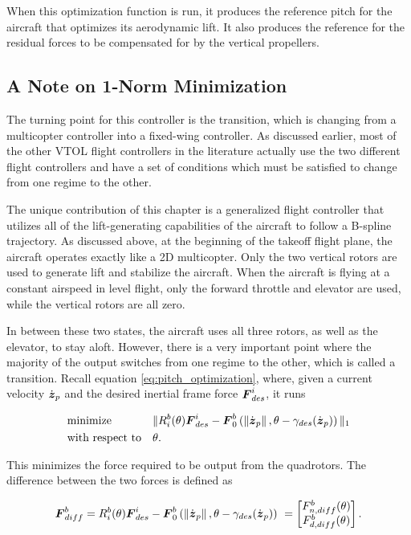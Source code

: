 When this optimization function is run, it produces the reference pitch for the aircraft that optimizes its aerodynamic lift.
It also produces the reference for the residual forces to be compensated for by the vertical propellers.

\subsection{A Note on 1-Norm Minimization}
\label{sec:one norm}

The turning point for this controller is the transition, which is changing from a multicopter controller into a fixed-wing controller. 
As discussed earlier, most of the other VTOL flight controllers in the literature actually use the two different flight controllers and have a set of conditions which must be satisfied to change from one regime to the other.

The unique contribution of this chapter is a generalized flight controller that utilizes all of the lift-generating capabilities of the aircraft to follow a B-spline trajectory. 
As discussed above, at the beginning of the takeoff flight plane, the aircraft operates exactly like a 2D multicopter. 
Only the two vertical rotors are used to generate lift and stabilize the aircraft. 
When the aircraft is flying at a constant airspeed in level flight, only the forward throttle and elevator are used, while the vertical rotors are all zero.

In between these two states, the aircraft uses all three rotors, as well as the elevator, to stay aloft. 
However, there is a very important point where the majority of the output switches from one regime to the other, which is called a transition. 
Recall equation \ref{eq:pitch_optimization}, where, given a current velocity $\dot{\boldsymbol{z}}_p$ and the desired inertial frame force $\boldsymbol{F}_{des}^i$, it runs

\begin{align}
    &\text{minimize} &&\|R_i^b(\theta)\boldsymbol{F}_{des}^i - \boldsymbol{F}_0^b\left(\left\|\dot{\boldsymbol{z}}_p\right\|, \theta-\gamma_{des}(\dot{\boldsymbol{z}}_p)\right)\|_1 \\
    &\text{with respect to} && \theta.
\end{align}

This minimizes the force required to be output from the quadrotors. 
The difference between the two forces is defined as

\begin{align}
    \boldsymbol{F}^b_{diff} = 
    R_i^b(\theta)\boldsymbol{F}_{des}^i - \boldsymbol{F}_0^b\left(\left\|\dot{\boldsymbol{z}}_p\right\|, \theta-\gamma_{des}(\dot{\boldsymbol{z}}_p)\right)\
    =
    \begin{bmatrix}
        F^b_{n,diff}(\theta)\\
        F^b_{d,diff}(\theta)
    \end{bmatrix}.
\end{align}

